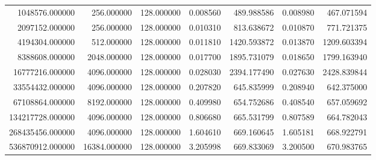 \begin{tabular}{rrrrrrr}
1048576.000000 & 256.000000 & 128.000000 & 0.008560 & 489.988586 & 0.008980 & 467.071594 \\
2097152.000000 & 256.000000 & 128.000000 & 0.010310 & 813.638672 & 0.010870 & 771.721375 \\
4194304.000000 & 512.000000 & 128.000000 & 0.011810 & 1420.593872 & 0.013870 & 1209.603394 \\
8388608.000000 & 2048.000000 & 128.000000 & 0.017700 & 1895.731079 & 0.018650 & 1799.163940 \\
16777216.000000 & 4096.000000 & 128.000000 & 0.028030 & 2394.177490 & 0.027630 & 2428.839844 \\
33554432.000000 & 4096.000000 & 128.000000 & 0.207820 & 645.835999 & 0.208940 & 642.375000 \\
67108864.000000 & 8192.000000 & 128.000000 & 0.409980 & 654.752686 & 0.408540 & 657.059692 \\
134217728.000000 & 4096.000000 & 128.000000 & 0.806680 & 665.531799 & 0.807589 & 664.782043 \\
268435456.000000 & 4096.000000 & 128.000000 & 1.604610 & 669.160645 & 1.605181 & 668.922791 \\
536870912.000000 & 16384.000000 & 128.000000 & 3.205998 & 669.833069 & 3.200500 & 670.983765 \\
\bottomrule
\end{tabular}
